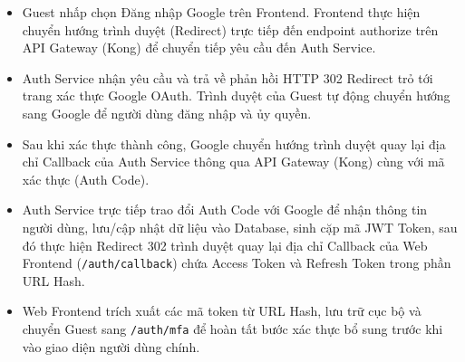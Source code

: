 \begin{itemize}
\item Guest nhấp chọn Đăng nhập Google trên Frontend. Frontend thực hiện chuyển hướng trình duyệt (Redirect) trực tiếp đến endpoint authorize trên API Gateway (Kong) để chuyển tiếp yêu cầu đến Auth Service.
\item Auth Service nhận yêu cầu và trả về phản hồi HTTP 302 Redirect trỏ tới trang xác thực Google OAuth. Trình duyệt của Guest tự động chuyển hướng sang Google để người dùng đăng nhập và ủy quyền.
\item Sau khi xác thực thành công, Google chuyển hướng trình duyệt quay lại địa chỉ Callback của Auth Service thông qua API Gateway (Kong) cùng với mã xác thực (Auth Code).
\item Auth Service trực tiếp trao đổi Auth Code với Google để nhận thông tin người dùng, lưu/cập nhật dữ liệu vào Database, sinh cặp mã JWT Token, sau đó thực hiện Redirect 302 trình duyệt quay lại địa chỉ Callback của Web Frontend (\texttt{/auth/callback}) chứa Access Token và Refresh Token trong phần URL Hash.
\item Web Frontend trích xuất các mã token từ URL Hash, lưu trữ cục bộ và chuyển Guest sang \texttt{/auth/mfa} để hoàn tất bước xác thực bổ sung trước khi vào giao diện người dùng chính.
\end{itemize}
